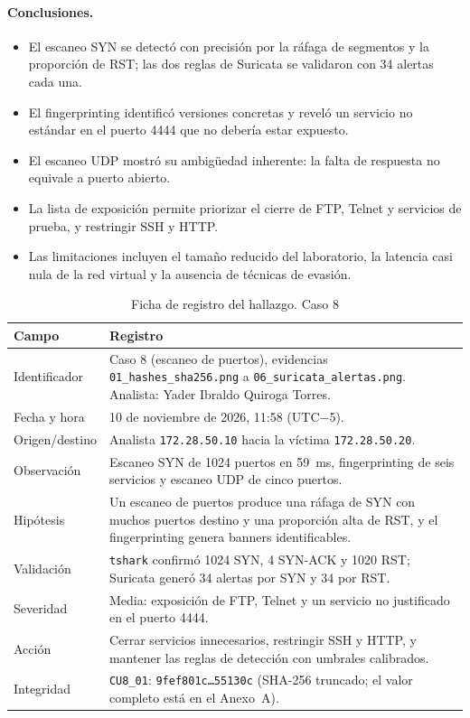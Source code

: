 \paragraph{Conclusiones.}
\begin{itemize}
	\item El escaneo SYN se detectó con precisión por la ráfaga de segmentos y la proporción de RST; las dos reglas de Suricata se validaron con 34 alertas cada una.
	\item El fingerprinting identificó versiones concretas y reveló un servicio no estándar en el puerto 4444 que no debería estar expuesto.
	\item El escaneo UDP mostró su ambigüedad inherente: la falta de respuesta no equivale a puerto abierto.
	\item La lista de exposición permite priorizar el cierre de FTP, Telnet y servicios de prueba, y restringir SSH y HTTP.
	\item Las limitaciones incluyen el tamaño reducido del laboratorio, la latencia casi nula de la red virtual y la ausencia de técnicas de evasión.
\end{itemize}

\begin{table}[H]
	\centering
	\caption{Ficha de registro del hallazgo. Caso 8}
	\footnotesize
	\renewcommand{\arraystretch}{1.2}
	\begin{tabularx}{\textwidth}{@{}>{\raggedright\arraybackslash}p{} Y@{}}
		\toprule
		\textbf{Campo} & \textbf{Registro} \\ \midrule
		Identificador & Caso 8 (escaneo de puertos), evidencias \texttt{01\_hashes\_sha256.png} a \texttt{06\_suricata\_alertas.png}. Analista: Yader Ibraldo Quiroga Torres. \\ \hline
		Fecha y hora & 10 de noviembre de 2026, 11:58 (UTC$-$5). \\ \hline
		Origen/destino & Analista \texttt{172.28.50.10} hacia la víctima \texttt{172.28.50.20}. \\ \hline
		Observación & Escaneo SYN de 1024 puertos en 59~ms, fingerprinting de seis servicios y escaneo UDP de cinco puertos. \\ \hline
		Hipótesis & Un escaneo de puertos produce una ráfaga de SYN con muchos puertos destino y una proporción alta de RST, y el fingerprinting genera banners identificables. \\ \hline
		Validación & \texttt{tshark} confirmó 1024 SYN, 4 SYN-ACK y 1020 RST; Suricata generó 34 alertas por SYN y 34 por RST. \\ \hline
		Severidad & Media: exposición de FTP, Telnet y un servicio no justificado en el puerto 4444. \\ \hline
		Acción & Cerrar servicios innecesarios, restringir SSH y HTTP, y mantener las reglas de detección con umbrales calibrados. \\ \hline
		Integridad & \texttt{CU8\_01}: \texttt{9fef801c\dots55130c} (SHA-256 truncado; el valor completo está en el Anexo~A). \\
		\bottomrule
	\end{tabularx}
\end{table}
